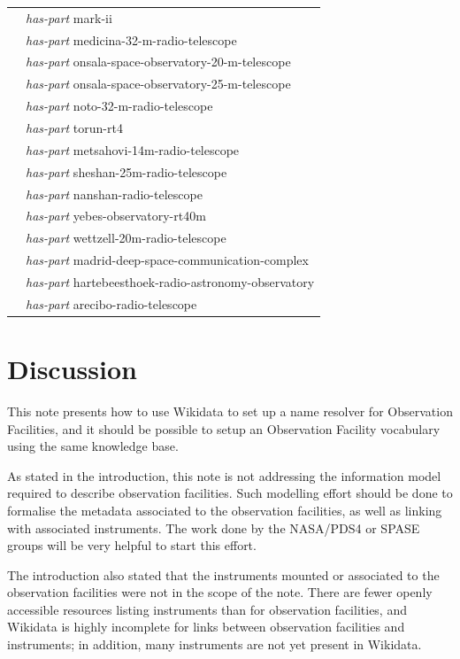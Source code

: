 \documentclass[11pt,a4paper]{ivoa}
\begin{document}
{\begin{longtable}{p{}p{}}
                        & \emph{has-part} mark-ii\\
                        & \emph{has-part} medicina-32-m-radio-telescope\\
                        & \emph{has-part} onsala-space-observatory-20-m-telescope\\
                        & \emph{has-part} onsala-space-observatory-25-m-telescope\\
                        & \emph{has-part} noto-32-m-radio-telescope\\
                        & \emph{has-part} torun-rt4\\
                        & \emph{has-part} metsahovi-14m-radio-telescope\\
                        & \emph{has-part} sheshan-25m-radio-telescope\\
                        & \emph{has-part} nanshan-radio-telescope\\
                        & \emph{has-part} yebes-observatory-rt40m\\
                        & \emph{has-part} wettzell-20m-radio-telescope\\
                        & \emph{has-part} madrid-deep-space-communication-complex\\
                        & \emph{has-part} hartebeesthoek-radio-astronomy-observatory\\
                        & \emph{has-part} arecibo-radio-telescope\\
\hline
\end{longtable}}

\section{Discussion}
This note presents how to use Wikidata to set up a name resolver
for Observation Facilities, and it should be possible to setup
an Observation Facility vocabulary using the same knowledge base.

As stated in the introduction, this note is not addressing the
information model required to describe observation facilities.
Such modelling effort should be done to formalise the metadata
associated to the observation facilities, as well as linking
with associated instruments. The work done by the NASA/PDS4 or
SPASE groups will be very helpful to start this effort.

The introduction also stated that the instruments mounted or
associated to the observation facilities were not in the scope
of the note. There are fewer openly accessible resources
listing instruments than for observation facilities, and
Wikidata is highly incomplete for links between observation facilities
and instruments; in addition, many instruments
are not yet present in Wikidata.
\end{document}
